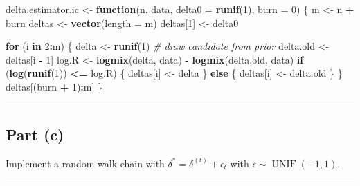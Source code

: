 \documentclass[
  11pt,
]{paper}
\newenvironment{Shaded}{\begin{snugshade}}{\end{snugshade}}
\newcommand{\AttributeTok}[1]{\textcolor[rgb]{0.13,0.29,0.53}{#1}}
\newcommand{\CommentTok}[1]{\textcolor[rgb]{0.56,0.35,0.01}{\textit{#1}}}
\newcommand{\ControlFlowTok}[1]{\textcolor[rgb]{0.13,0.29,0.53}{\textbf{#1}}}
\newcommand{\DecValTok}[1]{\textcolor[rgb]{0.00,0.00,0.81}{#1}}
\newcommand{\FunctionTok}[1]{\textcolor[rgb]{0.13,0.29,0.53}{\textbf{#1}}}
\newcommand{\NormalTok}[1]{#1}
\newcommand{\OtherTok}[1]{\textcolor[rgb]{0.56,0.35,0.01}{#1}}
\newcommand{\SpecialCharTok}[1]{\textcolor[rgb]{0.81,0.36,0.00}{\textbf{#1}}}
\begin{document}
\begin{Shaded}
\begin{Highlighting}[]
\NormalTok{delta.estimator.ic }\OtherTok{\textless{}{-}} \ControlFlowTok{function}\NormalTok{(n, data, }\AttributeTok{delta0 =} \FunctionTok{runif}\NormalTok{(}\DecValTok{1}\NormalTok{), }\AttributeTok{burn =} \DecValTok{0}\NormalTok{) \{}
\NormalTok{    m }\OtherTok{\textless{}{-}}\NormalTok{ n }\SpecialCharTok{+}\NormalTok{ burn}
\NormalTok{    deltas }\OtherTok{\textless{}{-}} \FunctionTok{vector}\NormalTok{(}\AttributeTok{length =}\NormalTok{ m)}
\NormalTok{    deltas[}\DecValTok{1}\NormalTok{] }\OtherTok{\textless{}{-}}\NormalTok{ delta0}

    \ControlFlowTok{for}\NormalTok{ (i }\ControlFlowTok{in} \DecValTok{2}\SpecialCharTok{:}\NormalTok{m) \{}
\NormalTok{        delta }\OtherTok{\textless{}{-}} \FunctionTok{runif}\NormalTok{(}\DecValTok{1}\NormalTok{)  }\CommentTok{\# draw candidate from prior}
\NormalTok{        delta.old }\OtherTok{\textless{}{-}}\NormalTok{ deltas[i }\SpecialCharTok{{-}} \DecValTok{1}\NormalTok{]}
\NormalTok{        log.R }\OtherTok{\textless{}{-}} \FunctionTok{logmix}\NormalTok{(delta, data) }\SpecialCharTok{{-}} \FunctionTok{logmix}\NormalTok{(delta.old, data)}
        \ControlFlowTok{if}\NormalTok{ (}\FunctionTok{log}\NormalTok{(}\FunctionTok{runif}\NormalTok{(}\DecValTok{1}\NormalTok{)) }\SpecialCharTok{\textless{}=}\NormalTok{ log.R) \{}
\NormalTok{            deltas[i] }\OtherTok{\textless{}{-}}\NormalTok{ delta}
\NormalTok{        \} }\ControlFlowTok{else}\NormalTok{ \{}
\NormalTok{            deltas[i] }\OtherTok{\textless{}{-}}\NormalTok{ delta.old}
\NormalTok{        \}}
\NormalTok{    \}}
\NormalTok{    deltas[(burn }\SpecialCharTok{+} \DecValTok{1}\NormalTok{)}\SpecialCharTok{:}\NormalTok{m]}
\NormalTok{\}}
\end{Highlighting}
\end{Shaded}

\begin{center}\rule{0.5\linewidth}{0.5pt}\end{center}

\hypertarget{part-c-1}{%
\subsection{Part (c)}\label{part-c-1}}

Implement a random walk chain with
\(\delta^* = \delta^{(t)} + \epsilon_t\) with
\(\epsilon \sim \operatorname{UNIF}(-1,1)\).

\begin{center}\rule{0.5\linewidth}{0.5pt}\end{center}
\end{document}
